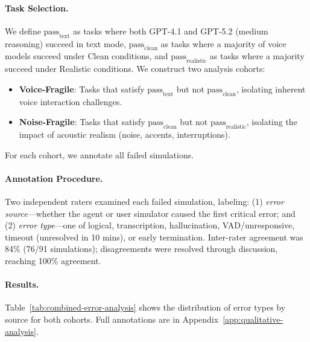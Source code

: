 \paragraph{Task Selection.} We define $\text{pass}_{\text{text}}$ as tasks where both GPT-4.1 and GPT-5.2 (medium reasoning) succeed in text mode, $\text{pass}_{\text{clean}}$ as tasks where a majority of voice models succeed under Clean conditions, and $\text{pass}_{\text{realistic}}$ as tasks where a majority succeed under Realistic conditions. We construct two analysis cohorts:
\begin{itemize}[nosep,leftmargin=*]
    \item \textbf{Voice-Fragile}: Tasks that satisfy $\text{pass}_{\text{text}}$ but not $\text{pass}_{\text{clean}}$, isolating inherent voice interaction challenges.
    \item \textbf{Noise-Fragile}: Tasks that satisfy $\text{pass}_{\text{clean}}$ but not $\text{pass}_{\text{realistic}}$, isolating the impact of acoustic realism (noise, accents, interruptions).
\end{itemize}
For each cohort, we annotate all failed simulations.

\paragraph{Annotation Procedure.} Two independent raters examined each failed simulation, labeling: (1) \textit{error source}---whether the agent or user simulator caused the first critical error; and (2) \textit{error type}---one of logical, transcription, hallucination, VAD/unresponsive, timeout (unresolved in 10 mins), or early termination. Inter-rater agreement was 84\% (76/91 simulations); disagreements were resolved through discussion, reaching 100\% agreement.

\paragraph{Results.} Table~\ref{tab:combined-error-analysis} shows the distribution of error types by source for both cohorts. Full annotations are in Appendix~\ref{app:qualitative-analysis}.

\begin{table}[h]
\caption{Error analysis: distribution of error types by source. Agent errors dominate in both cohorts (79\% and 90\%).}
\label{tab:combined-error-analysis}
\centering
\begin{small}
\resizebox{0.85\columnwidth}{!}{%

}
\end{small}
\end{table}

